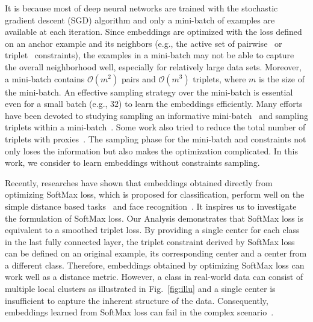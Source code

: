 \documentclass[10pt,twocolumn,letterpaper]{article}
\def \OO {\mathcal{O}}
\begin{document}
It is because most of deep neural networks are trained with the stochastic gradient descent (SGD) algorithm and only a mini-batch of examples are available at each iteration. Since embeddings are optimized with the loss defined on an anchor example and its neighbors (e.g., the active set of pairwise~\cite{XingNJR02} or triplet~\cite{WeinbergerS09} constraints), the examples in a mini-batch may not be able to capture the overall neighborhood well, especially for relatively large data sets. Moreover, a mini-batch contains $\OO(m^2)$ pairs and $\OO(m^3)$ triplets, where $m$ is the size of the mini-batch. An effective sampling strategy over the mini-batch is essential even for a small batch (e.g., $32$) to learn the embeddings efficiently. Many efforts have been devoted to studying sampling an informative mini-batch~\cite{RippelPDB15,SchroffKP15} and sampling triplets within a mini-batch~\cite{ManmathaWSK17,SongXJS16}. Some work also tried to reduce the total number of triplets with proxies~\cite{Attias17,QianTLZJ18}. The sampling phase for the mini-batch and constraints not only loses the information but also makes the optimization complicated. In this work, we consider to learn embeddings without constraints sampling.

Recently, researches have shown that embeddings obtained directly from optimizing SoftMax loss, which is proposed for classification, perform well on the simple distance based tasks~\cite{Sohn16,WenZL016} and face recognition~\cite{07698, LiuWYLRS17,LiuWYY16,WangCLL18,WangWZJGZL018}. It inspires us to investigate the formulation of SoftMax loss. Our Analysis demonstrates that SoftMax loss is equivalent to a smoothed triplet loss. By providing a single center for each class in the last fully connected layer, the triplet constraint derived by SoftMax loss can be defined on an original example, its corresponding center and a center from a different class. Therefore, embeddings obtained by optimizing SoftMax loss can work well as a distance metric. However, a class in real-world data can consist of multiple local clusters as illustrated in Fig.~\ref{fig:illu} and a single center is insufficient to capture the inherent structure of the data. Consequently, embeddings learned from SoftMax loss can fail in the complex scenario~\cite{Sohn16}.
\end{document}
